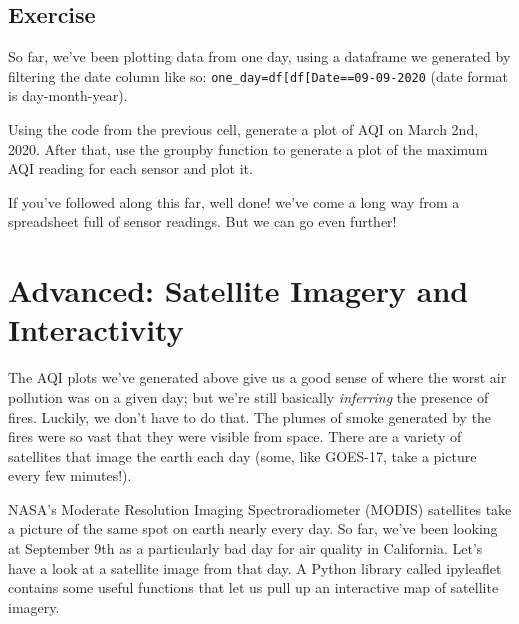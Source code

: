 \documentclass[
  letterpaper,
  DIV=11,
  numbers=noendperiod]{scrreprt}
\begin{document}
\hypertarget{exercise-6}{%
\subsection{Exercise}\label{exercise-6}}

So far, we've been plotting data from one day, using a dataframe we
generated by filtering the date column like so:
\texttt{one\_day=df{[}df{[}\textquotesingle{}Date\textquotesingle{}{]}==\textquotesingle{}09-09-2020\textquotesingle{}{]}}
(date format is day-month-year).

Using the code from the previous cell, generate a plot of AQI on March
2nd, 2020. After that, use the groupby function to generate a plot of
the maximum AQI reading for each sensor and plot it.

If you've followed along this far, well done! we've come a long way from
a spreadsheet full of sensor readings. But we can go even further!

\hypertarget{advanced-satellite-imagery-and-interactivity}{%
\section{Advanced: Satellite Imagery and
Interactivity}\label{advanced-satellite-imagery-and-interactivity}}

The AQI plots we've generated above give us a good sense of where the
worst air pollution was on a given day; but we're still basically
\emph{inferring} the presence of fires. Luckily, we don't have to do
that. The plumes of smoke generated by the fires were so vast that they
were visible from space. There are a variety of satellites that image
the earth each day (some, like GOES-17, take a picture every few
minutes!).

NASA's Moderate Resolution Imaging Spectroradiometer (MODIS) satellites
take a picture of the same spot on earth nearly every day. So far, we've
been looking at September 9th as a particularly bad day for air quality
in California. Let's have a look at a satellite image from that day. A
Python library called ipyleaflet contains some useful functions that let
us pull up an interactive map of satellite imagery.
\end{document}
